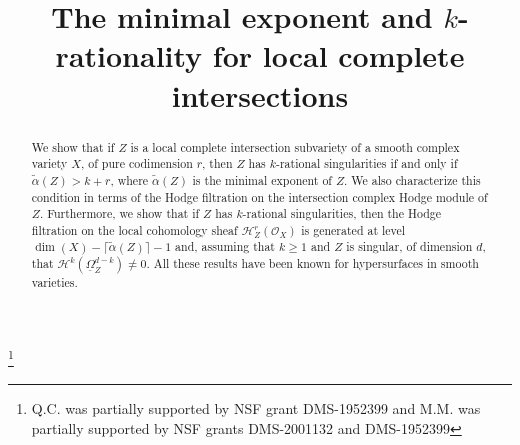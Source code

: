 \documentclass[JEP,XML,SOM,Unicode]{cedram}
\theoremstyle{plain}
\theoremstyle{definition}
\newcommand\cH{\mathcal{H}}
\newcommand\cO{\mathcal{O}}
\newcommand\cH{\mathcal{H}}
\newcommand\cO{\mathcal{O}}
\begin{document}
\frontmatter

\title[The minimal exponent and $k$-rationality] {The minimal exponent and \texorpdfstring{$k$\protect\nobreakdash-ra\-tio\-nality}{krat} for local complete intersections}

\author[\initial{Q.} \lastname{Chen}]{ }
\address{Department of Mathematics, University of Michigan,\\
530 Church Street, Ann Arbor, MI 48109, USA}

\author[\initial{B.} \lastname{Dirks}]{ }
\address{Department of Mathematics, University of Michigan,\\
530 Church Street, Ann Arbor, MI 48109, USA}

\author[\initial{M.} \lastname{Musta\c{t}\u{a}}]{ }
\address{Department of Mathematics, University of Michigan,\\
530 Church Street, Ann Arbor, MI 48109, USA}

\thanks{Q.C. was partially supported by NSF grant DMS-1952399 and M.M. was partially supported by NSF grants DMS-2001132 and DMS-1952399}

\begin{abstract}
We show that if $Z$ is a local complete intersection subvariety of a smooth complex variety $X$, of pure codimension $r$, then $Z$ has $k$-rational singularities if and only if $\widetilde{\alpha}(Z)>k+r$, where $\widetilde{\alpha}(Z)$ is the minimal exponent of $Z$. We also characterize this condition in terms of the Hodge filtration on the intersection complex Hodge module of $Z$. Furthermore, we show that if $Z$ has $k$-rational singularities, then the Hodge filtration on the local cohomology sheaf $\cH^r_Z(\cO_X)$ is generated at level $\dim(X)-\lceil \widetilde{\alpha}(Z)\rceil-1$ and, assuming that $k\geq 1$ and $Z$ is singular, of dimension $d$, that $\cH^k(\underline{\Omega}_Z^{d-k})\neq 0$. All these results have been known for hypersurfaces in smooth varieties.
\end{abstract}


\end{document}
